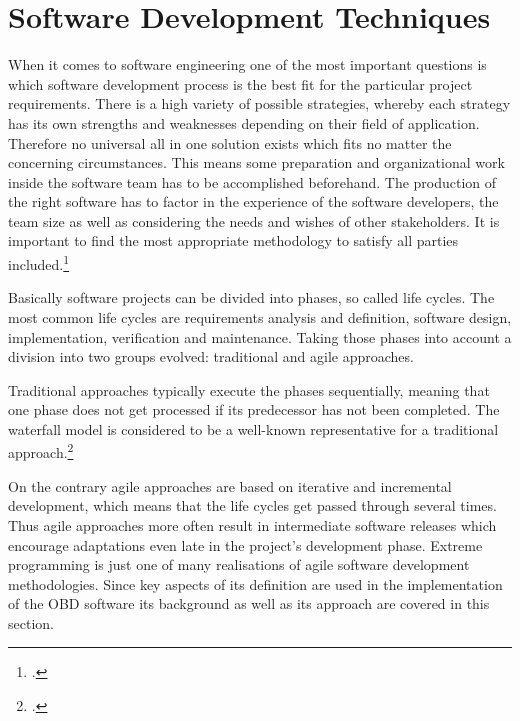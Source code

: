 
\chapter{Software Development Techniques}
\label{sec:SDT}

When it comes to software engineering one of the most important questions is which software development process 
is the best fit for the particular project requirements. There is a high variety of possible strategies, whereby 
each strategy has its own strengths and weaknesses depending on their field of application. Therefore no universal 
all in one solution exists which fits no matter the concerning circumstances. This means some preparation and 
organizational work inside the software team has to be accomplished beforehand. The production of the right software 
has to factor in the experience of the software developers, the team size as well as considering the needs and wishes 
of other stakeholders. It is important to find the most appropriate methodology to satisfy all parties included.\footcite{???}

Basically software projects can be divided into phases, so called life cycles. The most common life cycles are 
requirements analysis and definition, software design, implementation, verification and maintenance. Taking those 
phases into account a division into two groups evolved: traditional and agile approaches.

Traditional approaches typically execute the phases sequentially, meaning that one phase does not get processed if 
its predecessor has not been completed. The waterfall model is considered to be a well-known representative for a traditional approach.\footcite{WATERFALL}


On the contrary agile approaches are based on iterative and incremental development, which means that the life cycles 
get passed through several times. Thus agile approaches more often result in intermediate software releases which 
encourage adaptations even late in the project’s development phase. Extreme programming is just one of many realisations 
of agile software development methodologies. Since key aspects of its definition are used in the implementation of the OBD 
software its background as well as its approach are covered in this section. 

